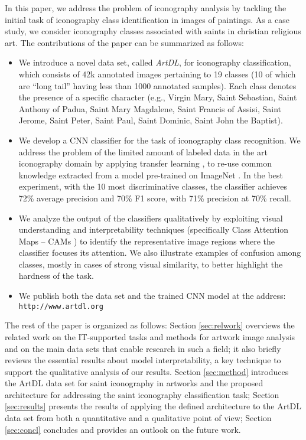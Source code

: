 \documentclass[acmlarge]{acmart}
\newcommand{\quoted}[1]{``#1''}
\begin{document}
In this paper, we address the problem of iconography analysis  by tackling the initial task of iconography class identification in images of paintings. As a case study, we consider iconography classes associated with saints in christian religious art. 
The contributions of the paper can be summarized as follows:

\begin{itemize}
    \item We introduce a novel data set, called \textit{ArtDL},  for iconography classification, which consists of 42k  annotated images pertaining to 19 classes (10 of which are \quoted{long tail} having less than 1000 annotated samples). Each class denotes the presence of a specific character (e.g., Virgin Mary, Saint Sebastian, Saint Anthony of Padua, Saint Mary Magdalene, Saint Francis of Assisi, Saint Jerome, Saint Peter, Saint Paul, Saint Dominic, Saint John the Baptist).
    \item We develop a CNN classifier for the task of iconography class recognition. We address the problem of the limited amount of labeled data in the art iconography domain by applying transfer learning \cite{pan2009survey}, to re-use common knowledge extracted from a model pre-trained on ImageNet \cite{deng2009imagenet}. In the best experiment, with the 10 most discriminative classes, the classifier achieves 72\% average precision and 70\% F1 score, with 71\% precision at 70\% recall.
    \item   We analyze the output of the classifiers qualitatively   by exploiting visual understanding and interpretability techniques (specifically Class Attention Maps -- CAMs \cite{zhou2016learning})  to identify the representative image regions where the classifier  focuses its attention. We also illustrate examples of confusion among classes, mostly in cases of strong visual similarity, to  better highlight the hardness of the task.
    \item We publish both the data set and the trained CNN model at the address: \texttt{http://www.artdl.org}
\end{itemize}



The rest of the paper is organized as follows:
Section \ref{sec:relwork} overviews the related work on the IT-supported tasks and methods for artwork image analysis and on the main data sets that enable research in such a  field; it also briefly reviews the essential results about model interpretability, a key technique to support the qualitative analysis of our results.  
Section \ref{sec:method} introduces the ArtDL data set for saint iconography in artworks and the proposed architecture for addressing the saint iconography  classification task;
Section \ref{sec:results} presents the results of applying the defined architecture to the ArtDL data set from both a quantitative and a qualitative point of view;
Section \ref{sec:concl} concludes and provides an outlook on the future work.
\end{document}
